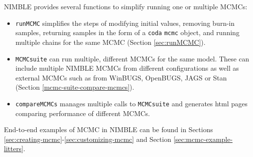 \documentclass[12pt,oneside]{book}\usepackage[]{graphicx}\usepackage[]{color}
\def\cd#1{\texttt{#1}}
\begin{document}
NIMBLE provides several functions to simplify running one or multiple MCMCs:
\begin{itemize}
\item \cd{runMCMC} simplifies the steps of modifying initial values, removing burn-in samples, returning samples in the form of a \cd{coda} \cd{mcmc} object, and running multiple chains for the same MCMC (Section \ref{sec:runMCMC}).
\item \cd{MCMCsuite} can run multiple, different MCMCs for the same model.  These can include multiple NIMBLE MCMCs from different configurations as well as external MCMCs such as from WinBUGS, OpenBUGS, JAGS or Stan (Section \ref{mcmc-suite-compare-mcmcs}).
\item \cd{compareMCMCs} manages multiple calls to \cd{MCMCsuite} and generates html pages comparing performance of different MCMCs.
\end{itemize}

End-to-end examples of MCMC in NIMBLE can be found in Sections \ref{sec:creating-mcmc}-\ref{sec:customizing-mcmc} and Section \ref{sec:mcmc-example-litters}.





\end{document}
